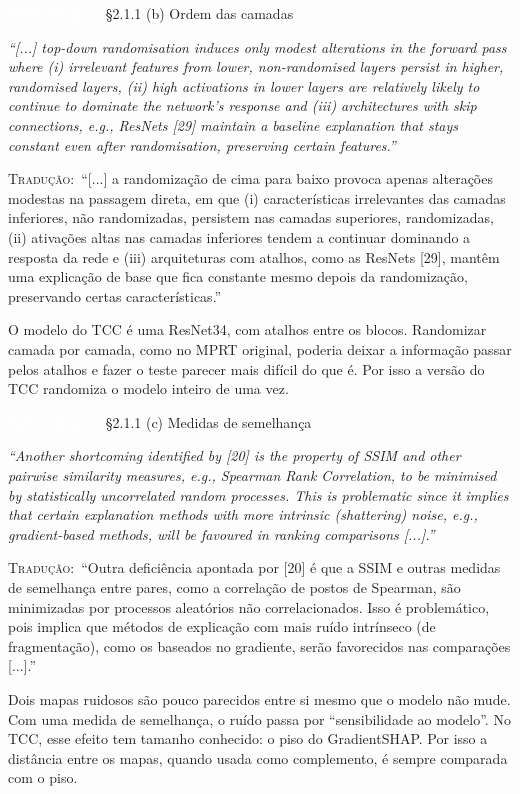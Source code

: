 \documentclass[11pt,a4paper]{article}
\newcommand{\pagechip}[1]{{\setlength{\fboxsep}{1.5pt}\colorbox{cAcc}{\textcolor{white}{\scriptsize\texttt{#1}}}}}
\newenvironment{origquote}{\par\itshape\small}{\par}
\newenvironment{tradquote}{\par\small\textsc{Tradução:}\ }{\par}
\newcommand{\explab}[1]{\par\smallskip{\small\color{cAcc}\textbf{\MakeUppercase{#1}}}\par}
\begin{document}
\begin{citacard}{\pagechip{Hedström p. 3} §2.1.1 (b) Ordem das camadas}
\begin{origquote}“[...] top-down randomisation induces only modest alterations in the forward pass where (i) irrelevant features from lower, non-randomised layers persist in higher, randomised layers, (ii) high activations in lower layers are relatively likely to continue to dominate the network's response and (iii) architectures with skip connections, e.g., ResNets [29] maintain a baseline explanation that stays constant even after randomisation, preserving certain features.”\end{origquote}
\begin{tradquote}“[...] a randomização de cima para baixo provoca apenas alterações modestas na passagem direta, em que (i) características irrelevantes das camadas inferiores, não randomizadas, persistem nas camadas superiores, randomizadas, (ii) ativações altas nas camadas inferiores tendem a continuar dominando a resposta da rede e (iii) arquiteturas com atalhos, como as ResNets [29], mantêm uma explicação de base que fica constante mesmo depois da randomização, preservando certas características.”\end{tradquote}
\explab{Explicação}
O modelo do TCC é uma ResNet34, com atalhos entre os blocos. Randomizar camada por camada, como no MPRT original, poderia deixar a informação passar pelos atalhos e fazer o teste parecer mais difícil do que é. Por isso a versão do TCC randomiza o modelo inteiro de uma vez.
\end{citacard}

\begin{citacard}{\pagechip{Hedström p. 4} §2.1.1 (c) Medidas de semelhança}
\begin{origquote}“Another shortcoming identified by [20] is the property of SSIM and other pairwise similarity measures, e.g., Spearman Rank Correlation, to be minimised by statistically uncorrelated random processes. This is problematic since it implies that certain explanation methods with more intrinsic (shattering) noise, e.g., gradient-based methods, will be favoured in ranking comparisons [...].”\end{origquote}
\begin{tradquote}“Outra deficiência apontada por [20] é que a SSIM e outras medidas de semelhança entre pares, como a correlação de postos de Spearman, são minimizadas por processos aleatórios não correlacionados. Isso é problemático, pois implica que métodos de explicação com mais ruído intrínseco (de fragmentação), como os baseados no gradiente, serão favorecidos nas comparações [...].”\end{tradquote}
\explab{Explicação}
Dois mapas ruidosos são pouco parecidos entre si mesmo que o modelo não mude. Com uma medida de semelhança, o ruído passa por “sensibilidade ao modelo”. No TCC, esse efeito tem tamanho conhecido: o piso do GradientSHAP. Por isso a distância entre os mapas, quando usada como complemento, é sempre comparada com o piso.
\end{citacard}
\end{document}
